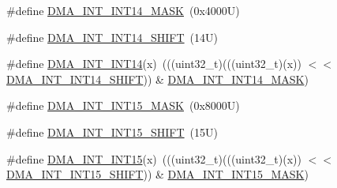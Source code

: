 \begin{DoxyCompactItemize}
\item 
\#define \mbox{\hyperlink{group___d_m_a___register___masks_gaba1fe3369c67b0c78b3d367dec815c35}{D\+M\+A\+\_\+\+I\+N\+T\+\_\+\+I\+N\+T14\+\_\+\+M\+A\+SK}}~(0x4000\+U)
\item 
\#define \mbox{\hyperlink{group___d_m_a___register___masks_ga248026e756c5719ee01b1c3e52728f07}{D\+M\+A\+\_\+\+I\+N\+T\+\_\+\+I\+N\+T14\+\_\+\+S\+H\+I\+FT}}~(14\+U)
\item 
\#define \mbox{\hyperlink{group___d_m_a___register___masks_gaaada4e06bd95d1839ad76727e0d3ae43}{D\+M\+A\+\_\+\+I\+N\+T\+\_\+\+I\+N\+T14}}(x)~(((uint32\+\_\+t)(((uint32\+\_\+t)(x)) $<$$<$ \mbox{\hyperlink{group___d_m_a___register___masks_ga248026e756c5719ee01b1c3e52728f07}{D\+M\+A\+\_\+\+I\+N\+T\+\_\+\+I\+N\+T14\+\_\+\+S\+H\+I\+FT}})) \& \mbox{\hyperlink{group___d_m_a___register___masks_gaba1fe3369c67b0c78b3d367dec815c35}{D\+M\+A\+\_\+\+I\+N\+T\+\_\+\+I\+N\+T14\+\_\+\+M\+A\+SK}})
\item 
\#define \mbox{\hyperlink{group___d_m_a___register___masks_ga592c02e91817cad070da87935df7834d}{D\+M\+A\+\_\+\+I\+N\+T\+\_\+\+I\+N\+T15\+\_\+\+M\+A\+SK}}~(0x8000\+U)
\item 
\#define \mbox{\hyperlink{group___d_m_a___register___masks_gaed1bff29b12027726c7d736adda1ce88}{D\+M\+A\+\_\+\+I\+N\+T\+\_\+\+I\+N\+T15\+\_\+\+S\+H\+I\+FT}}~(15\+U)
\item 
\#define \mbox{\hyperlink{group___d_m_a___register___masks_ga9eb5bb09f8ccf66c35c4bfbfe783066b}{D\+M\+A\+\_\+\+I\+N\+T\+\_\+\+I\+N\+T15}}(x)~(((uint32\+\_\+t)(((uint32\+\_\+t)(x)) $<$$<$ \mbox{\hyperlink{group___d_m_a___register___masks_gaed1bff29b12027726c7d736adda1ce88}{D\+M\+A\+\_\+\+I\+N\+T\+\_\+\+I\+N\+T15\+\_\+\+S\+H\+I\+FT}})) \& \mbox{\hyperlink{group___d_m_a___register___masks_ga592c02e91817cad070da87935df7834d}{D\+M\+A\+\_\+\+I\+N\+T\+\_\+\+I\+N\+T15\+\_\+\+M\+A\+SK}})
\end{DoxyCompactItemize}
